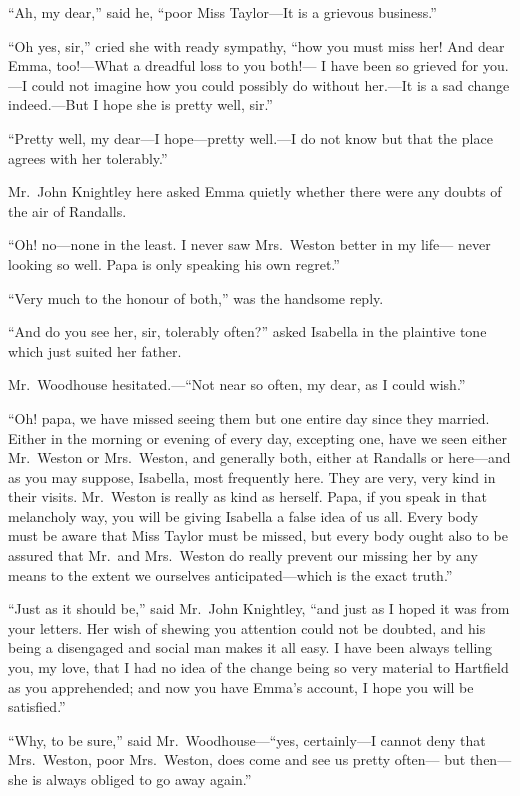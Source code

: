 ``Ah, my dear,'' said he, ``poor Miss Taylor---It is a grievous business.''

``Oh yes, sir,'' cried she with ready sympathy, ``how you must
miss her!  And dear Emma, too!---What a dreadful loss to you both!---%
I have been so grieved for you.---I could not imagine how you could
possibly do without her.---It is a sad change indeed.---But I hope
she is pretty well, sir.''

``Pretty well, my dear---I hope---pretty well.---I do not know
but that the place agrees with her tolerably.''

Mr.\ John Knightley here asked Emma quietly whether there were any
doubts of the air of Randalls.

``Oh! no---none in the least.  I never saw Mrs.\ Weston better in my life---%
never looking so well.  Papa is only speaking his own regret.''

``Very much to the honour of both,'' was the handsome reply.

``And do you see her, sir, tolerably often?'' asked Isabella
in the plaintive tone which just suited her father.

Mr.\ Woodhouse hesitated.---``Not near so often, my dear, as I could wish.''

``Oh! papa, we have missed seeing them but one entire day since
they married.  Either in the morning or evening of every day,
excepting one, have we seen either Mr.\ Weston or Mrs.\ Weston,
and generally both, either at Randalls or here---and as you
may suppose, Isabella, most frequently here.  They are very,
very kind in their visits.  Mr.\ Weston is really as kind as herself.
Papa, if you speak in that melancholy way, you will be giving
Isabella a false idea of us all.  Every body must be aware that Miss
Taylor must be missed, but every body ought also to be assured
that Mr.\ and Mrs.\ Weston do really prevent our missing her by any
means to the extent we ourselves anticipated---which is the exact truth.''

``Just as it should be,'' said Mr.\ John Knightley, ``and just as I hoped
it was from your letters.  Her wish of shewing you attention could
not be doubted, and his being a disengaged and social man makes it
all easy.  I have been always telling you, my love, that I had no idea
of the change being so very material to Hartfield as you apprehended;
and now you have Emma's account, I hope you will be satisfied.''

``Why, to be sure,'' said Mr.\ Woodhouse---``yes, certainly---I cannot deny
that Mrs.\ Weston, poor Mrs.\ Weston, does come and see us pretty often---%
but then---she is always obliged to go away again.''

